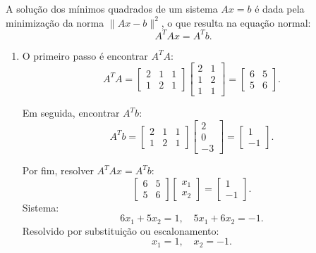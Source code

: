 \begin{resolution}
  A solução dos mínimos quadrados de um sistema \( Ax = b \) é dada pela minimização da norma \( \|Ax - b\|^2 \), o que resulta na equação normal:
  \[
    A^T A x = A^T b.
  \]

  \begin{enumerate}[label=\alph*)]
    \item O primeiro passo é encontrar \( A^T A \):
          \[
            A^T A = \begin{bmatrix}
              2 & 1 & 1 \\
              1 & 2 & 1
            \end{bmatrix}
            \begin{bmatrix}
              2 & 1 \\
              1 & 2 \\
              1 & 1
            \end{bmatrix} =
            \begin{bmatrix}
              6 & 5 \\
              5 & 6
            \end{bmatrix}.
          \]

          Em seguida, encontrar \( A^T b \):
          \[
            A^T b = \begin{bmatrix}
              2 & 1 & 1 \\
              1 & 2 & 1
            \end{bmatrix}
            \begin{bmatrix}
              2 \\
              0 \\
              -3
            \end{bmatrix} =
            \begin{bmatrix}
              1 \\
              -1
            \end{bmatrix}.
          \]

          Por fim, resolver \( A^T A x = A^T b \):
          \[
            \begin{bmatrix}
              6 & 5 \\
              5 & 6
            \end{bmatrix}
            \begin{bmatrix}
              x_1 \\
              x_2
            \end{bmatrix} =
            \begin{bmatrix}
              1 \\
              -1
            \end{bmatrix}.
          \]
          Sistema:
          \[
            6x_1 + 5x_2 = 1, \quad 5x_1 + 6x_2 = -1.
          \]
          Resolvido por substituição ou escalonamento:
          \[
            x_1 = 1, \quad x_2 = -1.
          \]


\end{enumerate}
\end{resolution}

